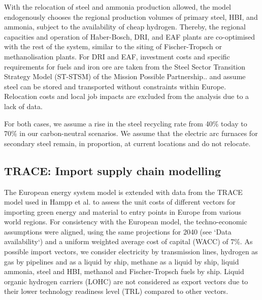 With the relocation of steel and ammonia production allowed, the model
endogenously chooses the regional production volumes of primary steel, HBI, and
ammonia, subject to the availability of cheap hydrogen. Thereby, the regional
capacities and operation of Haber-Bosch, DRI, and EAF plants are co-optimised
with the rest of the system, similar to the siting of Fischer-Tropsch or
methanolisation plants. For DRI and EAF, investment costs and specific
requirements for fuels and iron ore are taken from the Steel Sector Transition
Strategy Model (ST-STSM) of the Mission Possible
Partnership.\cite{missionpossiblepartnershipSteelSectorTransition2022,missionpossiblepartnershipMakingNetZeroSteel2022}.
and assume steel can be stored and transported without constraints within
Europe. Relocation costs and local job impacts are excluded from the analysis
due to a lack of data.

For both cases, we assume a rise in the steel recycling rate from 40\% today to
70\% in our carbon-neutral
scenarios.\cite{materialeconomicsIndustrialTransformation20502019} We assume
that the electric arc furnaces for secondary steel remain, in proportion, at
current locations and do not relocate.

\subsection*{TRACE: Import supply chain modelling}

The European energy system model is extended with data from the TRACE model used
in Hampp et al.\cite{hamppImportOptions2023} to assess the unit costs of
different vectors for importing green energy and material to entry points in
Europe from various world regions. For consistency with the European model, the
techno-economic assumptions were aligned, using the same projections for 2040
(see `Data availability`) and a uniform weighted average cost of capital (WACC)
of 7\%.\cite{lonerganImprovingRepresentationCost2023} As possible import
vectors, we consider electricity by transmission lines, hydrogen as gas by
pipelines and as a liquid by ship, methane as a liquid by ship, liquid ammonia,
steel and HBI, methanol and Fischer-Tropsch fuels by ship. Liquid organic
hydrogen carriers (LOHC) are not considered as export vectors due to their lower
technology readiness level (TRL) compared to other
vectors.\cite{irenaGlobalHydrogenTrade2022}

